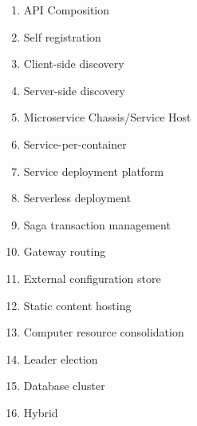 \documentclass{article}
\theoremstyle{mytheoremstyle}
\theoremstyle{mytheoremstyle}
\theoremstyle{myproblemstyle}
\begin{document}
\begin{enumerate}
  \item API Composition 
  \item Self registration 
  \item Client-side discovery 
  \item Server-side discovery 
  \item Microservice Chassis/Service Host   
  \item Service-per-container
  \item Service deployment platform 
  \item Serverless deployment 
  \item Saga transaction management
  \item Gateway routing 
  \item External configuration store 
  \item Static content hosting 
  \item Computer resource consolidation 
  \item Leader election 
  \item Database cluster
  \item Hybrid
\end{enumerate}
\end{document}
